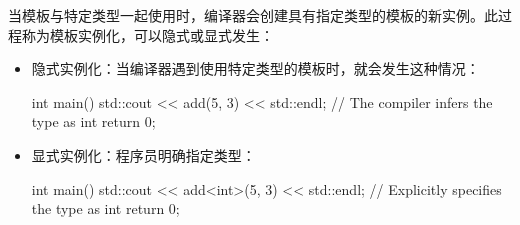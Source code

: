 当模板与特定类型一起使用时，编译器会创建具有指定类型的模板的新实例。此过程称为模板实例化，可以隐式或显式发生：

\begin{itemize}
\item
隐式实例化：当编译器遇到使用特定类型的模板时，就会发生这种情况：

\begin{cpp}
int main() {
    std::cout << add(5, 3) << std::endl; // The compiler infers the type as int
    return 0;
}
\end{cpp}

\item
显式实例化：程序员明确指定类型：

\begin{cpp}
int main() {
    std::cout << add<int>(5, 3) << std::endl; // Explicitly specifies the type as int
    return 0;
}
\end{cpp}
\end{itemize}